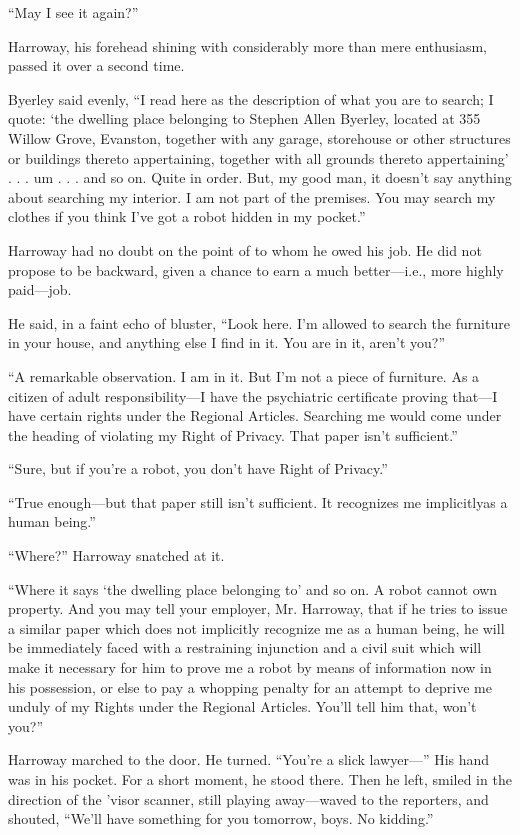 \documentclass[10pt,a5paper,twoside]{book}
\begin{document}
“May I see it again?”

Harroway, his forehead shining with considerably more than mere enthusiasm, passed it over a second time.

Byerley said evenly, “I read here as the description of what you are to search; I quote: ‘the dwelling place belonging to Stephen Allen Byerley, located at 355 Willow Grove, Evanston, together with any garage, storehouse or other structures or buildings thereto appertaining, together with all grounds thereto appertaining’ . . . um . . . and so on. Quite in order. But, my good man, it doesn’t say anything about searching my interior. I am not part of the premises. You may search my clothes if you think I’ve got a robot hidden in my pocket.”

Harroway had no doubt on the point of to whom he owed his job. He did not propose to be backward, given a chance to earn a much better—i.e., more highly paid—job.

He said, in a faint echo of bluster, “Look here. I’m allowed to search the furniture in your house, and anything else I find in it. You are in it, aren’t you?”

“A remarkable observation. I am in it. But I’m not a piece of furniture. As a citizen of adult responsibility—I have the psychiatric certificate proving that—I have certain rights under the Regional Articles. Searching me would come under the heading of violating my Right of Privacy. That paper isn’t sufficient.”

“Sure, but if you’re a robot, you don’t have Right of Privacy.”

“True enough—but that paper still isn’t sufficient. It recognizes me implicitlyas a human being.”

“Where?” Harroway snatched at it.

“Where it says ‘the dwelling place belonging to’ and so on. A robot cannot own property. And you may tell your employer, Mr. Harroway, that if he tries to issue a similar paper which does not implicitly recognize me as a human being, he will be immediately faced with a restraining injunction and a civil suit which will make it necessary for him to prove me a robot by means of information now in his possession, or else to pay a whopping penalty for an attempt to deprive me unduly of my Rights under the Regional Articles. You’ll tell him that, won’t you?”

Harroway marched to the door. He turned. “You’re a slick lawyer—” His hand was in his pocket. For a short moment, he stood there. Then he left, smiled in the direction of the ’visor scanner, still playing away—waved to the reporters, and shouted, “We’ll have something for you tomorrow, boys. No kidding.”
\end{document}
